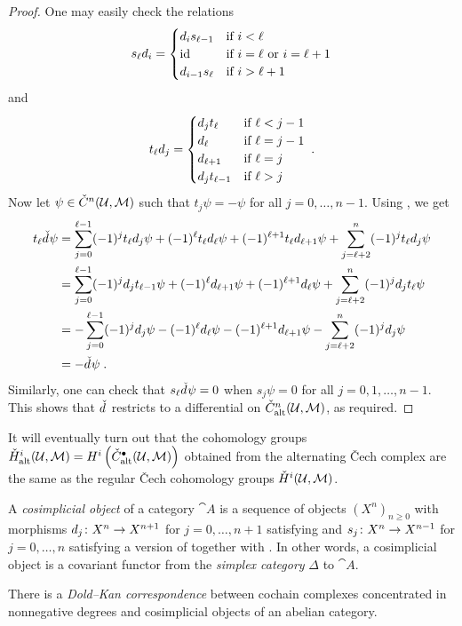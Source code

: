 \documentclass[a4paper,parskip=half,numbers=enddot, DIV=12]{scrreprt}
\newcommand{\vC}{\v{C}}
\renewcommand{\geq}{\geqslant}
\begin{document}
\begin{proof}
		One may easily check the relations
		\begin{align}\lbl{eq:cosimplicialDegeneracies}
			s_\ell d_i=\begin{cases}
				d_is_{\ell-1} & \text{if }i<\ell\\
				\id &  \text{if }i=\ell\text{ or }i=\ell+1\\
				d_{i-1}s_\ell &  \text{if }i>\ell+1
			\end{cases}
		\end{align}
		and
		\begin{align}\lbl{eq:transpositions}
			t_\ell d_j=\begin{cases}
				d_jt_{\ell} & \text{if }\ell<j-1\\
				d_\ell &  \text{if }\ell=j-1\\
				d_{\ell+1} &  \text{if }\ell=j\\
				d_jt_{\ell-1} & \text{if }\ell>j
			\end{cases}\;.
		\end{align}
		Now let $\psi\in\check{C}^n(\mathcal{U},\mathcal{M})$ such that $t_j\psi=-\psi$ for all $j=0,\ldots,n-1$. Using , we get
		\begin{align*}
			t_\ell\check{d}\hspace{0.06125em}\psi&=\sum_{j=0}^{\ell-1}(-1)^jt_\ell d_j\psi+(-1)^\ell t_\ell d_\ell\psi+(-1)^{\ell+1} t_\ell d_{\ell+1}\psi+\sum_{j=\ell+2}^n(-1)^jt_\ell d_j\psi\\
			&=\sum_{j=0}^{\ell-1}(-1)^jd_jt_{\ell-1}\psi+(-1)^\ell d_{\ell+1}\psi+(-1)^{\ell+1} d_\ell\psi+\sum_{j=\ell+2}^{n}(-1)^j d_jt_\ell\psi\\
			&=-\sum_{j=0}^{\ell-1}(-1)^jd_j\psi-(-1)^\ell d_\ell\psi-(-1)^{\ell+1} d_{\ell+1}\psi-\sum_{j=\ell+2}^{n}(-1)^j d_j\psi\\
			&=-\check{d}\hspace{0.06125em}\psi\;.
		\end{align*}
		Similarly, one can check that $s_\ell\check{d}\hspace{0.06125em}\psi=0$ when $s_j\psi=0$ for all $j=0,1,\ldots,n-1$. This shows that $\check{d}\hspace{0.06125em}$ restricts to a differential on $\check{C}_{\mathrm{alt}}
		^n(\mathcal{U},\mathcal{M})$, as required.
	\end{proof}
	It will eventually turn out that the cohomology groups $\check{H}_{\mathrm{alt}}^i(\mathcal{U},\mathcal{M})=H^i\left(\check{C}_{\mathrm{alt}}^\bullet (\mathcal{U},\mathcal{M})\right)$ obtained from the alternating \vC ech complex are the same as the regular \vC ech cohomology groups $\check{H}^i(\mathcal{U},\mathcal{M})$.
\begin{rem}
	A \emph{cosimplicial object} of a category ${\cat A}$ is a sequence of objects $(X^n)_{n\geq 0}$ with morphisms $d_j\colon X^n\morphism X^{n+1}$ for $j=0,\ldots,n+1$ satisfying  and $s_j\colon X^n\morphism X^{n-1}$ for $j=0,\ldots,n$ satisfying a version of  together with . In other words, a cosimplicial object is a covariant functor from the \emph{simplex category} $\Delta$ to ${\cat A}$.
	
	There is a \emph{Dold--Kan correspondence} between cochain complexes concentrated in nonnegative degrees and cosimplicial objects of an abelian category.  
\end{rem}
\end{document}
